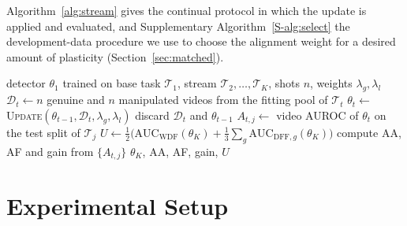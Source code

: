 \documentclass[journal]{IEEEtran}
\begin{document}
Algorithm~\ref{alg:stream} gives the continual protocol in which the update is applied and evaluated, and Supplementary Algorithm~\ref{S-alg:select} the development-data procedure we use to choose the alignment weight for a desired amount of plasticity (Section~\ref{sec:matched}).

\begin{algorithm}[t]
\caption{Continual updating and evaluation}
\label{alg:stream}
\footnotesize
\begin{algorithmic}[1]
\Require detector $\theta_1$ trained on base task $\mathcal{T}_1$, stream $\mathcal{T}_2,\dots,\mathcal{T}_K$, shots $n$, weights $\lambda_g,\lambda_l$
  \State $\mathcal{D}_t\gets n$ genuine and $n$ manipulated videos from the fitting pool of $\mathcal{T}_t$
  \State $\theta_t\gets$ \textsc{Update}$(\theta_{t-1},\mathcal{D}_t,\lambda_g,\lambda_l)$ 
  \State discard $\mathcal{D}_t$ and $\theta_{t-1}$ 
    \State $A_{t,j}\gets$ video AUROC of $\theta_t$ on the test split of $\mathcal{T}_j$
  \EndFor
\EndFor
\State $U\gets\frac12\big(\mathrm{AUC}_{\mathrm{WDF}}(\theta_K)+\frac13\sum_g\mathrm{AUC}_{\mathrm{DFF},g}(\theta_K)\big)$ 
\State compute AA, AF and gain from $\{A_{t,j}\}$
\State \Return $\theta_K$, AA, AF, gain, $U$
\end{algorithmic}
\end{algorithm}

\section{Experimental Setup}
\label{sec:setup}
\end{document}
